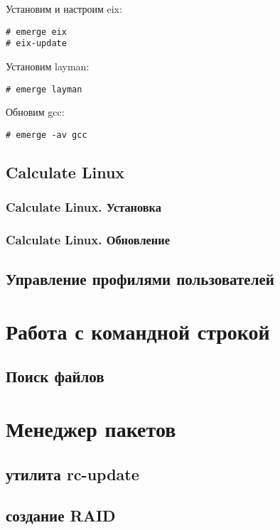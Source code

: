 \documentclass[12pt, a4paper]{article}
\begin{document}
Установим и настроим eix:
\begin{verbatim}
# emerge eix
# eix-update
\end{verbatim}

Установим layman:
\begin{verbatim}
# emerge layman
\end{verbatim}

Обновим gcc:
\begin{verbatim}
# emerge -av gcc
\end{verbatim}

\subsection{Calculate Linux}

\subsubsection{Calculate Linux. Установка}
\subsubsection{Calculate Linux. Обновление}

\subsection{Управление профилями пользователей}

\newpage 

\section{Работа с командной строкой}

\subsection{Поиск файлов}

\newpage

\section{Менеджер пакетов}

\subsection{утилита rc-update}

\subsection{создание RAID}
\end{document}
